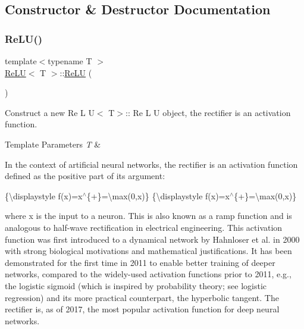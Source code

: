 \subsection{Constructor \& Destructor Documentation}
\mbox{\label{class_re_l_u_ad378d979e537b8af65513b3cb9bfe2b1}} 
\subsubsection{\texorpdfstring{ReLU()}{ReLU()}}
{\footnotesize\ttfamily template$<$typename T $>$ \\
\mbox{\hyperlink{class_re_l_u}{Re\+LU}}$<$ T $>$\+::\mbox{\hyperlink{class_re_l_u}{Re\+LU}} (\begin{DoxyParamCaption}{ }\end{DoxyParamCaption})}



Construct a new Re L U$<$ T$>$\+:: Re L U object, the rectifier is an activation function. 


\begin{DoxyTemplParams}{Template Parameters}
{\em T} & \\
\hline
\end{DoxyTemplParams}
In the context of artificial neural networks, the rectifier is an activation function defined as the positive part of its argument\+:

\{\textbackslash{}displaystyle f(x)=x$^\wedge$\{+\}=\textbackslash{}max(0,x)\} \{\textbackslash{}displaystyle f(x)=x$^\wedge$\{+\}=\textbackslash{}max(0,x)\}

where x is the input to a neuron. This is also known as a ramp function and is analogous to half-\/wave rectification in electrical engineering. This activation function was first introduced to a dynamical network by Hahnloser et al. in 2000 with strong biological motivations and mathematical justifications. It has been demonstrated for the first time in 2011 to enable better training of deeper networks, compared to the widely-\/used activation functions prior to 2011, e.\+g., the logistic sigmoid (which is inspired by probability theory; see logistic regression) and its more practical counterpart, the hyperbolic tangent. The rectifier is, as of 2017, the most popular activation function for deep neural networks. \mbox{\label{class_re_l_u_a6694b0386daea4398ad932f92382e206}} 
